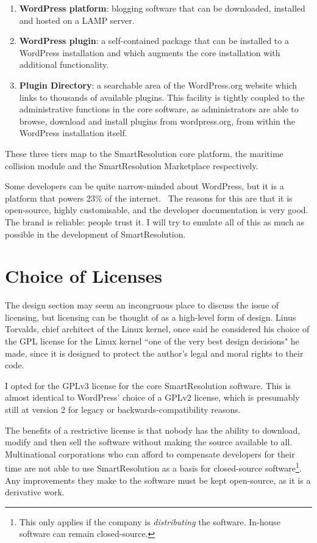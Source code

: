 \begin{enumerate}
    \item \textbf{WordPress platform}: blogging software that can be downloaded, installed and hosted on a LAMP server.

    \item \textbf{WordPress plugin}: a self-contained package that can be installed to a WordPress installation and which augments the core installation with additional functionality.

    \item \textbf{Plugin Directory}: a searchable area of the WordPress.org website which links to thousands of available plugins. This facility is tightly coupled to the administrative functions in the core software, as administrators are able to browse, download and install plugins from wordpress.org, from within the WordPress installation itself.
\end{enumerate}

These three tiers map to the SmartResolution core platform, the maritime collision module and the SmartResolution Marketplace respectively.

Some developers can be quite narrow-minded about WordPress, but it is a platform that powers 23\% of the internet.~\cite{wordpressPopular} The reasons for this are that it is open-source, highly customisable, and the developer documentation is very good. The brand is reliable: people trust it. I will try to emulate all of this as much as possible in the development of SmartResolution.

\section{Choice of Licenses}

The design section may seem an incongruous place to discuss the issue of licensing, but licensing can be thought of as a high-level form of design. Linus Torvalds, chief architect of the Linux kernel, once said he considered his choice of the GPL license for the Linux kernel ``one of the very best design decisions" he made, since it is designed to protect the author's legal and moral rights to their code.~\cite{linusLinux}

I opted for the GPLv3 license for the core SmartResolution software. This is almost identical to WordPress' choice of a GPLv2 license, which is presumably still at version 2 for legacy or backwards-compatibility reasons.

The benefits of a restrictive license is that nobody has the ability to download, modify and then sell the software without making the source available to all. Multinational corporations who can afford to compensate developers for their time are not able to use SmartResolution as a basis for closed-source software\footnote{This only applies if the company is \emph{distributing} the software. In-house software can remain closed-source.}. Any improvements they make to the software must be kept open-source, as it is a derivative work.

